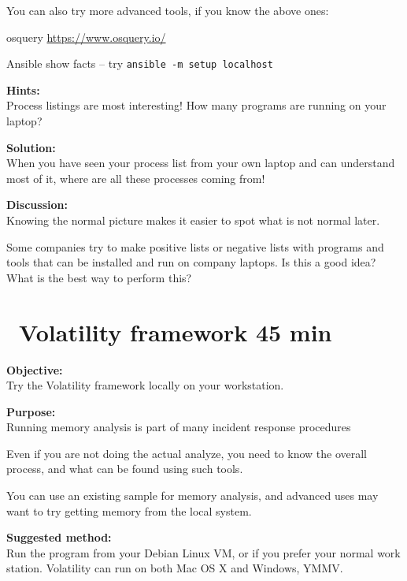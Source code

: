 \documentclass[a4paper,11pt,notitlepage]{report}
\begin{document}
You can also try more advanced tools, if you know the above ones:
\begin{list2}
\item osquery \url{https://www.osquery.io/}
\item Ansible show facts -- try \verb+ansible -m setup localhost+
\end{list2}





{\bf Hints:}\\
Process listings are most interesting! How many programs are running on your laptop?



{\bf Solution:}\\
When you have seen your process list from your own laptop and can understand most of it, where are all these processes coming from!

{\bf Discussion:}\\
Knowing the normal picture makes it easier to spot what is not normal later.

Some companies try to make positive lists or negative lists with programs and tools that can be installed and run on company laptops. Is this a good idea? What is the best way to perform this?






\chapter{\faExclamationTriangle\ Volatility framework 45 min}
\label{ex:volatility-install}

{\bf Objective:}\\
Try the Volatility framework locally on your workstation.


{\bf Purpose:}\\
Running memory analysis is part of many incident response procedures

Even if you are not doing the actual analyze, you need to know the overall process, and what can be found using such tools.

You can use an existing sample for memory analysis, and advanced uses may want to try getting memory from the local system.

{\bf Suggested method:}\\
Run the program from your Debian Linux VM, or if you prefer your normal work station. Volatility can run on both Mac OS X and Windows, YMMV.
\end{document}
